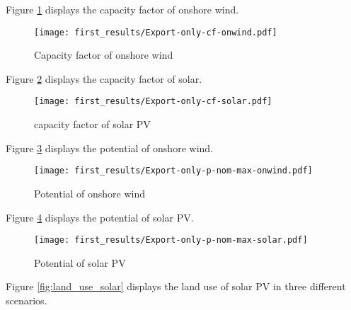 \lipsum[1]



Figure \ref{fig:cf-onwind} displays the capacity factor of onshore wind.

\begin{figure}[h!]
    \centering
    \texttt{[image: first\_results/Export-only-cf-onwind.pdf]}
    \caption{Capacity factor of onshore wind}
    \label{fig:cf-onwind}
\end{figure}


Figure \ref{fig:cf-solar} displays the capacity factor of solar.

\begin{figure}[h!]
    \centering
    \texttt{[image: first\_results/Export-only-cf-solar.pdf]}
    \caption{capacity factor of solar PV}
    \label{fig:cf-solar}
\end{figure}


Figure \ref{fig:p-nom-max-onwind} displays the potential of onshore wind.

\begin{figure}[h!]
    \centering
    \texttt{[image: first\_results/Export-only-p-nom-max-onwind.pdf]}
    \caption{Potential of onshore wind}
    \label{fig:p-nom-max-onwind}
\end{figure}


Figure \ref{fig:p-nom-max-solar} displays the potential of solar PV.

\begin{figure}[h!]
    \centering
    \texttt{[image: first\_results/Export-only-p-nom-max-solar.pdf]}
    \caption{Potential of solar PV}
    \label{fig:p-nom-max-solar}
\end{figure}


Figure \ref{fig:land_use_solar} displays the land use of solar PV in three different scenarios.

